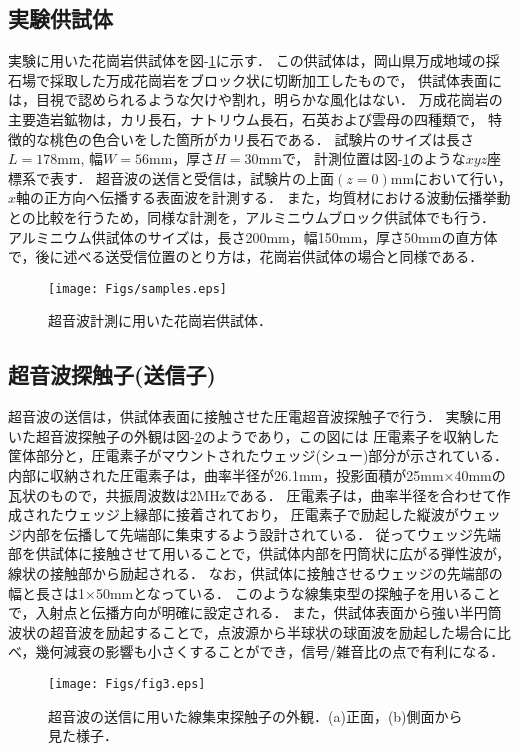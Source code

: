 ﻿%
\subsection{実験供試体}
実験に用いた花崗岩供試体を図-\ref{fig:fig1}に示す．
この供試体は，岡山県万成地域の採石場で採取した万成花崗岩をブロック状に切断加工したもので，
供試体表面には，目視で認められるような欠けや割れ，明らかな風化はない．
万成花崗岩の主要造岩鉱物は，カリ長石，ナトリウム長石，石英および雲母の四種類で，
特徴的な桃色の色合いをした箇所がカリ長石である．
試験片のサイズは長さ$L=178$mm, 幅$W=56$mm，厚さ$H=30$mmで，
計測位置は図-\ref{fig:fig1}のような$xyz$座標系で表す．
超音波の送信と受信は，試験片の上面$(z=0)$mmにおいて行い，$x$軸の正方向へ伝播する表面波を計測する．
また，均質材における波動伝播挙動との比較を行うため，同様な計測を，アルミニウムブロック供試体でも行う．
アルミニウム供試体のサイズは，長さ200mm，幅150mm，厚さ50mmの直方体で，後に述べる送受信位置のとり方は，花崗岩供試体の場合と同様である．
\begin{figure}
\begin{center}
\texttt{[image: Figs/samples.eps]}
\caption{
	超音波計測に用いた花崗岩供試体．
}
\label{fig:fig1}
\end{center}
\end{figure}
\subsection{超音波探触子(送信子)}
超音波の送信は，供試体表面に接触させた圧電超音波探触子で行う．
実験に用いた超音波探触子の外観は図-\ref{fig:fig2}のようであり，この図には
圧電素子を収納した筐体部分と，圧電素子がマウントされたウェッジ(シュー)部分が示されている．
内部に収納された圧電素子は，曲率半径が26.1mm，投影面積が25mm×40mmの瓦状のもので，共振周波数は2MHzである．
圧電素子は，曲率半径を合わせて作成されたウェッジ上縁部に接着されており，
圧電素子で励起した縦波がウェッジ内部を伝播して先端部に集束するよう設計されている．
従ってウェッジ先端部を供試体に接触させて用いることで，供試体内部を円筒状に広がる弾性波が，線状の接触部から励起される．
なお，供試体に接触させるウェッジの先端部の幅と長さは1×50mmとなっている．
このような線集束型の探触子を用いることで，入射点と伝播方向が明確に設定される．
また，供試体表面から強い半円筒波状の超音波を励起することで，点波源から半球状の球面波を励起した場合に比べ，幾何減衰の影響も小さくすることができ，信号/雑音比の点で有利になる．
\begin{figure}[h]
\begin{center}
\texttt{[image: Figs/fig3.eps]}
\caption{
	超音波の送信に用いた線集束探触子の外観．(a)正面，(b)側面から見た様子．
}
\label{fig:fig2}
\end{center}
\end{figure}
